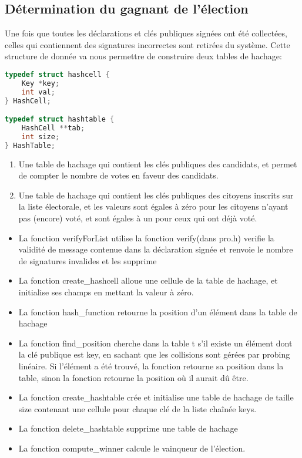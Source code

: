 \documentclass{article}
\begin{document}
\subsection{Détermination  du gagnant de l'élection}
Une fois que toutes les déclarations et clés publiques signées ont été collectées, celles qui contiennent des signatures incorrectes sont retirées du système.\newline
Cette structure de donnée va nous permettre de construire deux tables de hachage:
\begin{lstlisting}[language={C}]
typedef struct hashcell {
    Key *key;
    int val;
} HashCell;

typedef struct hashtable {
    HashCell **tab;
    int size;
} HashTable;
\end{lstlisting}
\begin{enumerate}
    \item Une table de hachage qui  contient les clés publiques des candidats, et permet de compter le nombre de votes en faveur des candidats.
    \item Une table de hachage qui contient les clés publiques des  citoyens inscrits sur la liste électorale, et les valeurs sont égales à zéro pour les citoyens n’ayant pas (encore) voté, et sont égales à un pour ceux qui ont déjà voté.
\end{enumerate}
\begin{itemize}
\begin{lstlisting}[language={C}]
int        verify_for_list_protected(CellProtected **LCP);
HashCell*  create_hashcell(Key *key);
int        hash_function(Key *key, int size);
int        find_position(HashTable *t, Key *key);
HashTable* create_hashtable(CellKey *keys, int size);
void       delete_hashtable(HashTable *t);
Key*       compute_winner(CellProtected *decl, CellKey *candidates, CellKey *voters, int sizeC, int sizeV);
\end{lstlisting}
\item La fonction verifyForList utilise la fonction verify(dans pro.h) verifie la validité de message contenue dans la déclaration signée et renvoie le nombre de signatures invalides et les supprime
\item La fonction create\_hashcell alloue une cellule de la table de hachage, et initialise ses champs en mettant la valeur à zéro.
\item La fonction hash\_function retourne la position d’un élément dans la table de hachage
\item La fonction find\_position cherche dans la table t s’il existe un élément dont la clé publique est key, en sachant que les collisions sont gérées par probing linéaire. Si l’élément a été trouvé, la fonction retourne sa position dans la table, sinon la fonction retourne la position où il aurait dû être.
\item La fonction create\_hashtable crée et initialise une table de hachage de taille size contenant une cellule pour chaque clé de la liste chaînée keys.
\item La fonction delete\_hashtable supprime une table de hachage
\item La fonction compute\_winner calcule le vainqueur de l’élection.
\end{itemize}\newline
\end{document}

